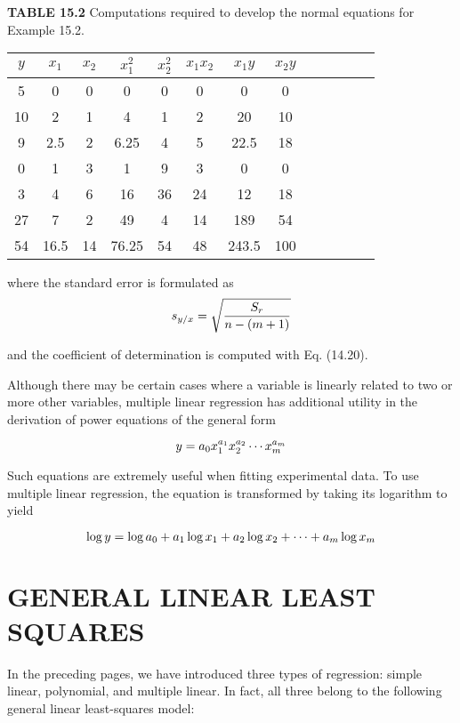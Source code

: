 \documentclass[../main.tex]{subfiles}
\begin{document}
\textbf{TABLE 15.2} \quad Computations required to develop the normal equations for Example 15.2.

\begin{tabular}{c c c c c c c c c c c c c}
	$y$ & $x_1$ & $x_2$ & $x^2_1$ & $x_2^2$ & $x_1 x_2$ & $x_1 y$ & $x_2 y$ \\ 
	\hline
	5 & 0 & 0 & 0 & 0 & 0 & 0 & 0 \\ 
	10 & 2 & 1 & 4 & 1 & 2 & 20 & 10 \\ 
	9 & 2.5 & 2 & 6.25 & 4 & 5 & 22.5 & 18 \\ 
	0 & 1 & 3 & 1 & 9 & 3 & 0 & 0 \\ 
	3 & 4 & 6 & 16 & 36 & 24 & 12 & 18 \\ 
	27 & 7 & 2 & 49 & 4 & 14 & 189 & 54 \\ 
	54 & 16.5 & 14 & 76.25 & 54 & 48 & 243.5 & 100            
\end{tabular}

\noindent where the standard error is formulated as
\begin{equation}
	\notag
	s_{y/x} = \sqrt{\frac{S_r}{n - (m + 1)}}
\end{equation}

\noindent and the coefficient of determination is computed with Eq. (14.20).

Although there may be certain cases where a variable is linearly related to two or more other variables, multiple linear regression has additional utility in the derivation of power equations of the general form 

\begin{equation}
	\notag
	y = a_0 x_1 ^ {a_1} x_2 ^ {a_2} \cdots x_m ^ {a_m}
\end{equation}

\noindent Such equations are extremely useful when fitting experimental data. To use multiple linear regression, the equation is transformed by taking its logarithm to yield

\begin{equation}
	\notag
	\log y = \log a_0 + a_1 \log x_1 + a_2 \log x_2 + \cdots + a_m \log x_m
\end{equation}

\label{cha:cha_P_15_3} %
\section{GENERAL LINEAR LEAST SQUARES}

\noindent In the preceding pages, we have introduced three types of regression: simple linear, polynomial, and multiple linear. In fact, all three belong to the following general linear least-squares model:
\end{document}
